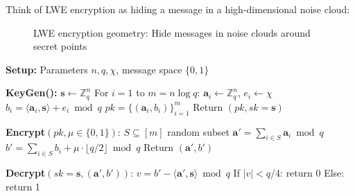 \documentclass[11pt,a4paper]{article}
\begin{document}
Think of LWE encryption as hiding a message in a high-dimensional noise cloud:

\begin{figure}[h]
\centering
{}
\caption{LWE encryption geometry: Hide messages in noise clouds around secret points}
\end{figure}

\begin{algorithm}
\caption{Regev's LWE Encryption Scheme}
\label{alg:lwe-enc}
\begin{algorithmic}[1]
\State \textbf{Setup:} Parameters $n, q, \chi$, message space $\{0,1\}$

\State \textbf{KeyGen():}
\State \quad $\mathbf{s} \leftarrow \mathbb{Z}_q^n$ 
\State \quad For $i = 1$ to $m = n \log q$:
\State \quad \quad $\mathbf{a}_i \leftarrow \mathbb{Z}_q^n$, $e_i \leftarrow \chi$
\State \quad \quad $b_i = \langle \mathbf{a}_i, \mathbf{s} \rangle + e_i \bmod q$
\State \quad $pk = \{(\mathbf{a}_i, b_i)\}_{i=1}^m$ 
\State \quad Return $(pk, sk = \mathbf{s})$

\State \textbf{Encrypt}$(pk, \mu \in \{0,1\})$:
\State \quad $S \subseteq [m]$ random subset
\State \quad $\mathbf{a}' = \sum_{i \in S} \mathbf{a}_i \bmod q$
\State \quad $b' = \sum_{i \in S} b_i + \mu \cdot \lfloor q/2 \rfloor \bmod q$
\State \quad Return $(\mathbf{a}', b')$

\State \textbf{Decrypt}$(sk = \mathbf{s}, (\mathbf{a}', b'))$:
\State \quad $v = b' - \langle \mathbf{a}', \mathbf{s} \rangle \bmod q$
\State \quad If $|v| < q/4$: return 0
\State \quad Else: return 1
\end{algorithmic}
\end{algorithm}
\end{document}
